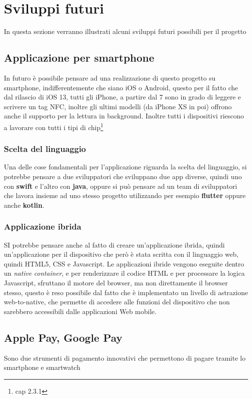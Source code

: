 \section{Sviluppi futuri}
\hspace{\parindent}In questa sezione verranno illustrati alcuni sviluppi futuri possibili per il progetto
\subsection{Applicazione per smartphone}
\hspace{\parindent}In futuro è possibile pensare ad una realizzazione di questo progetto su smartphone, indifferentemente che siano iOS o Android, questo per il fatto che dal rilascio di iOS 13, tutti gli iPhone, a partire dal 7 sono in grado di leggere e scrivere un tag NFC, inoltre gli ultimi modelli (da iPhone XS in poi) offrono anche il supporto per la lettura in background. Inoltre tutti i dispositivi riescono a lavorare con tutti i tipi di chip\footnote{cap 2.3.1}
\subsubsection{Scelta del linguaggio}
\hspace{\parindent}Una delle cose fondamentali per l'applicazione riguarda la scelta del linguaggio, si potrebbe pensare a due sviluppatori che sviluppano due app diverse, quindi uno con \textbf{swift} e l'altro con \textbf{java}, oppure si può pensare ad un team di sviluppatori che lavora insieme ad uno stesso progetto utilizzando per esempio \textbf{flutter} oppure anche \textbf{kotlin}.
\subsubsection{Applicazione ibrida}
\hspace{\parindent}SI potrebbe pensare anche al fatto di creare un'applicazione ibrida, quindi un'applicazione per il dispositivo che però è stata scritta con il linguaggio web, quindi HTML5, CSS e Javascript. Le applicazioni ibride vengono eseguite dentro un \textit{native container}, e per renderizzare il codice HTML e per processare la logica Javascript, sfruttano il motore del browser, ma non direttamente il browser stesso, questo è reso possibile dal fatto che è implementato un livello di astrazione web-to-native, che permette di accedere alle funzioni del dispositivo che non sarebbero accessibili dalle applicazioni Web mobile.

\subsection{Apple Pay, Google Pay}
\hspace{\parindent}Sono due strumenti di pagamento innovativi che permettono di pagare tramite lo smartphone e smartwatch

